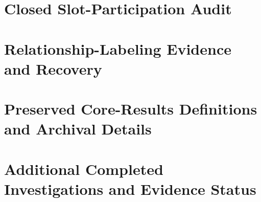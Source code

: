 \documentclass[pdflatex,sn-basic,Numbered]{sn-jnl}
\begin{document}
\section{Closed Slot-Participation Audit}
\label{app:g3}

\FloatBarrier
\section{Relationship-Labeling Evidence and Recovery}


\FloatBarrier
\section{Preserved Core-Results Definitions and Archival Details}

\FloatBarrier
\section{Additional Completed Investigations and Evidence Status}
\label{app:additional-evidence}



\end{document}
